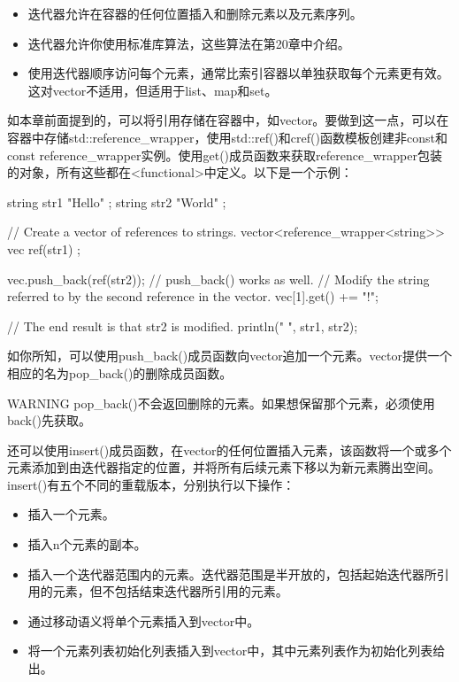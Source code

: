 \begin{itemize}
\item
迭代器允许在容器的任何位置插入和删除元素以及元素序列。

\item
迭代器允许你使用标准库算法，这些算法在第20章中介绍。

\item
使用迭代器顺序访问每个元素，通常比索引容器以单独获取每个元素更有效。这对vector不适用，但适用于list、map和set。
\end{itemize}


如本章前面提到的，可以将引用存储在容器中，如vector。要做到这一点，可以在容器中存储std::reference\_wrapper，使用std::ref()和cref()函数模板创建非const和const reference\_wrapper实例。使用get()成员函数来获取reference\_wrapper包装的对象，所有这些都在<functional>中定义。以下是一个示例：

\begin{cpp}
string str1 { "Hello" };
string str2 { "World" };

// Create a vector of references to strings.
vector<reference_wrapper<string>> vec { ref(str1) };

vec.push_back(ref(str2)); // push_back() works as well.
// Modify the string referred to by the second reference in the vector.
vec[1].get() += "!";

// The end result is that str2 is modified.
println("{} {}", str1, str2);
\end{cpp}


如你所知，可以使用push\_back()成员函数向vector追加一个元素。vector提供一个相应的名为pop\_back()的删除成员函数。

\begin{myWarning}{WARNING}
pop\_back()不会返回删除的元素。如果想保留那个元素，必须使用back()先获取。
\end{myWarning}

还可以使用insert()成员函数，在vector的任何位置插入元素，该函数将一个或多个元素添加到由迭代器指定的位置，并将所有后续元素下移以为新元素腾出空间。insert()有五个不同的重载版本，分别执行以下操作：

\begin{itemize}
\item
插入一个元素。

\item
插入n个元素的副本。

\item
插入一个迭代器范围内的元素。迭代器范围是半开放的，包括起始迭代器所引用的元素，但不包括结束迭代器所引用的元素。

\item
通过移动语义将单个元素插入到vector中。

\item
将一个元素列表初始化列表插入到vector中，其中元素列表作为初始化列表给出。
\end{itemize}

